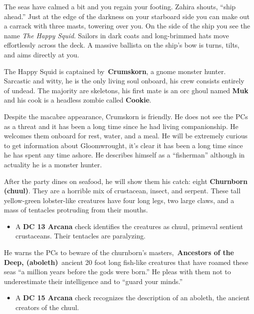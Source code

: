 \documentclass[10pt,twocolumn]{article}
\let\oldtextbf\textbf
\renewcommand{\textbf}[1]{\oldtextbf{{#1}}}
\providecommand{\tightlist}{
  \setlength{\itemsep}{4pt}
  \setlength{\topsep}{0pt}
  \setlength{\parsep}{0pt}
  \setlength{\parskip}{0pt}
  \setlength{\partopsep}{0pt}
}
\renewenvironment{quote}
  {%
    \begingroup
      \setlength{\parindent}{1em}%
      \setlength{\parskip}{0pt}%
      \begin{tcolorbox}[myquote,
        before upper={%
          \let\textbf\oldtextbf
          \setlength{\parindent}{1.5em}%
          \setlength{\parskip}{0pt}%
          \noindent              %
        }%
      ]%
  }
  {%
      \end{tcolorbox}%
    \endgroup
  }
\begin{document}
\begin{quote}
The seas have calmed a bit and you regain your footing. Zahira shouts,
``ship ahead.'' Just at the edge of the darkness on your starboard side
you can make out a carrack with three masts, towering over you. On the
side of the ship you see the name \emph{The Happy Squid}. Sailors in
dark coats and long-brimmed hats move effortlessly across the deck. A
massive ballista on the ship's bow is turns, tilts, and aims directly at
you.~
\end{quote}

The Happy Squid is captained by~\textbf{Crumskorn}, a gnome monster
hunter. Sarcastic and witty, he is the only living soul onboard, his
crew consists entirely of undead. The majority are skeletons, his first
mate is an orc ghoul named \textbf{Muk} and his cook is a headless
zombie called \textbf{Cookie}.~

Despite the macabre appearance, Crumskorn is friendly. He does not see
the PCs as a threat and it has been a long time since he had living
companionship. He welcomes them onboard for rest, water, and a meal. He
will be extremely curious to get information about Gloomwrought, it's
clear it has been a long time since he has spent any time ashore. He
describes himself as a ``fisherman'' although in actuality he is a
monster hunter.~

After the party dines on seafood, he will show them his catch: eight
\textbf{Churnborn (chuul)}. They are a horrible mix of crustacean,
insect, and serpent. These tall yellow-green lobster-like creatures have
four long legs, two large claws, and a mass of tentacles protruding from
their mouths.~

\begin{itemize}
\tightlist
\item
  A \textbf{DC 13 Arcana} check identifies the creatures as chuul,
  primeval sentient crustaceans. Their tentacles are paralyzing.
\end{itemize}

He warns the PCs to beware of the churnborn's masters,~\textbf{Ancestors
of the Deep, (aboleth)}~ancient 20 foot long fish-like creatures that
have roamed these seas ``a million years before the gods were born.'' He
pleas with them not to underestimate their intelligence and to ``guard
your minds.''~

\begin{itemize}
\tightlist
\item
  A \textbf{DC 15 Arcana} check recognizes the description of an
  aboleth, the ancient creators of the chuul.
\end{itemize}
\end{document}
